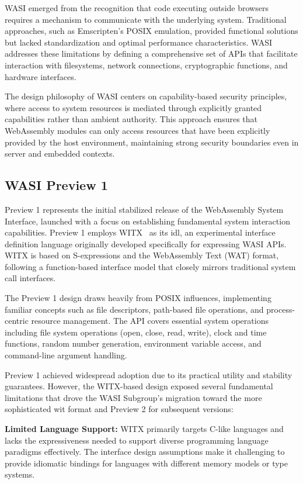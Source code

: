 WASI emerged from the recognition that code executing outside browsers requires a mechanism to communicate with the underlying system. Traditional approaches, such as Emscripten's POSIX emulation, provided functional solutions but lacked standardization and optimal performance characteristics. WASI addresses these limitations by defining a comprehensive set of APIs that facilitate interaction with filesystems, network connections, cryptographic functions, and hardware interfaces.

The design philosophy of WASI centers on capability-based security principles, where access to system resources is mediated through explicitly granted capabilities rather than ambient authority. This approach ensures that WebAssembly modules can only access resources that have been explicitly provided by the host environment, maintaining strong security boundaries even in server and embedded contexts.

\subsection{WASI Preview 1}
\label{subsec:wasi-preview1}
Preview 1 represents the initial stabilized release of the WebAssembly System Interface, launched with a focus on establishing fundamental system interaction capabilities. Preview 1 employs WITX~\cite{witx_docs} as its \acrfull{idl}, an experimental interface definition language originally developed specifically for expressing WASI APIs. WITX is based on S-expressions and the WebAssembly Text (WAT) format, following a function-based interface model that closely mirrors traditional system call interfaces.

The Preview 1 design draws heavily from POSIX influences, implementing familiar concepts such as file descriptors, path-based file operations, and process-centric resource management. The API covers essential system operations including file system operations (open, close, read, write), clock and time functions, random number generation, environment variable access, and command-line argument handling.

Preview 1 achieved widespread adoption due to its practical utility and stability guarantees. However, the WITX-based design exposed several fundamental limitations that drove the WASI Subgroup's migration toward the more sophisticated \acrshort{wit} format and Preview 2 for subsequent versions:

\textbf{Limited Language Support:} WITX primarily targets C-like languages and lacks the expressiveness needed to support diverse programming language paradigms effectively. The interface design assumptions make it challenging to provide idiomatic bindings for languages with different memory models or type systems.

